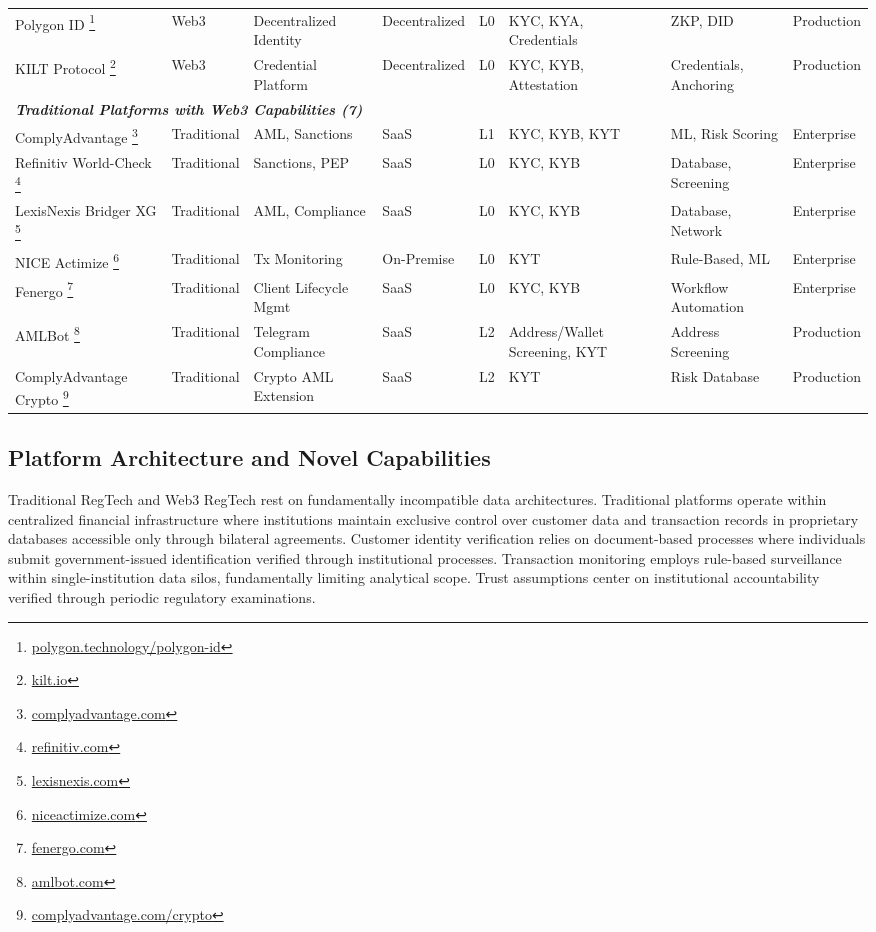 \documentclass[conference,compsoc]{IEEEtran}
\begin{document}
\begin{table}[htbp]
\begin{tabularx}{\textwidth}{p{1.5cm}p{0.9cm}X p{1.1cm}p{1.2cm}p{1.1cm}X p{0.9cm}}
Polygon ID \footnote{\url{polygon.technology/polygon-id}} & Web3 & Decentralized Identity & Decentralized & L0 & KYC, KYA, Credentials & ZKP, DID & Production \\
KILT Protocol \footnote{\url{kilt.io}} & Web3 & Credential Platform & Decentralized & L0 & KYC, KYB, Attestation & Credentials, Anchoring & Production \\
\hline
\multicolumn{8}{l}{\textit{\textbf{Traditional Platforms with Web3 Capabilities (7)}}} \\
\hline
ComplyAdvantage \footnote{\url{complyadvantage.com}} & Traditional & AML, Sanctions & SaaS & L1 & KYC, KYB, KYT & ML, Risk Scoring & Enterprise \\
Refinitiv World-Check \footnote{\url{refinitiv.com}} & Traditional & Sanctions, PEP & SaaS & L0 & KYC, KYB & Database, Screening & Enterprise \\
LexisNexis Bridger XG \footnote{\url{lexisnexis.com}} & Traditional & AML, Compliance & SaaS & L0 & KYC, KYB & Database, Network & Enterprise \\
NICE Actimize \footnote{\url{niceactimize.com}} & Traditional & Tx Monitoring & On-Premise & L0 & KYT & Rule-Based, ML & Enterprise \\
Fenergo \footnote{\url{fenergo.com}} & Traditional & Client Lifecycle Mgmt & SaaS & L0 & KYC, KYB & Workflow Automation & Enterprise \\
AMLBot \footnote{\url{amlbot.com}} & Traditional & Telegram Compliance & SaaS & L2 & Address/Wallet Screening, KYT & Address Screening & Production \\
ComplyAdvantage Crypto \footnote{\url{complyadvantage.com/crypto}} & Traditional & Crypto AML Extension & SaaS & L2 & KYT & Risk Database & Production \\
\hline
\end{tabularx}
\end{table}



\subsection{Platform Architecture and Novel Capabilities}

Traditional RegTech and Web3 RegTech rest on fundamentally incompatible data architectures. Traditional platforms operate within centralized financial infrastructure where institutions maintain exclusive control over customer data and transaction records in proprietary databases accessible only through bilateral agreements. Customer identity verification relies on document-based processes where individuals submit government-issued identification verified through institutional processes. Transaction monitoring employs rule-based surveillance within single-institution data silos, fundamentally limiting analytical scope. Trust assumptions center on institutional accountability verified through periodic regulatory examinations.
\end{document}
